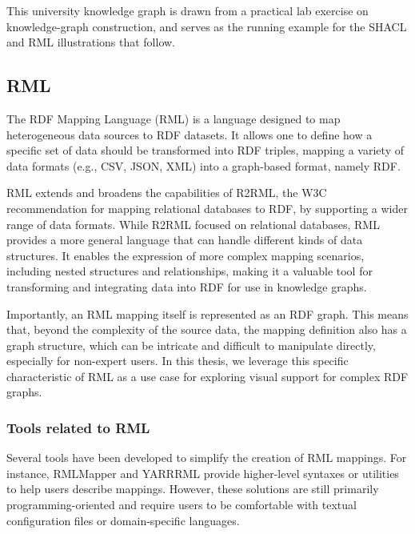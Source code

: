 This university knowledge graph is drawn from a practical lab exercise on knowledge-graph construction, and serves as the running example for the SHACL and RML illustrations that follow.

\subsection{RML}
\label{sec:background-rml}

The RDF Mapping Language (RML) is a language designed to map heterogeneous data sources to RDF datasets. It allows one to define how a specific set of data should be transformed into RDF triples, mapping a variety of data formats (e.g., CSV, JSON, XML) into a graph-based format, namely RDF.

RML extends and broadens the capabilities of R2RML, the W3C recommendation for mapping relational databases to RDF, by supporting a wider range of data formats. While R2RML focused on relational databases, RML provides a more general language that can handle different kinds of data structures. It enables the expression of more complex mapping scenarios, including nested structures and relationships, making it a valuable tool for transforming and integrating data into RDF for use in knowledge graphs.


Importantly, an RML mapping itself is represented as an RDF graph. This means that, beyond the complexity of the source data, the mapping definition also has a graph structure, which can be intricate and difficult to manipulate directly, especially for non-expert users. In this thesis, we leverage this specific characteristic of RML as a use case for exploring visual support for complex RDF graphs.



\subsubsection{Tools related to RML}

Several tools have been developed to simplify the creation of RML mappings. For instance, RMLMapper and YARRRML provide higher-level syntaxes or utilities to help users describe mappings. However, these solutions are still primarily programming-oriented and require users to be comfortable with textual configuration files or domain-specific languages.

